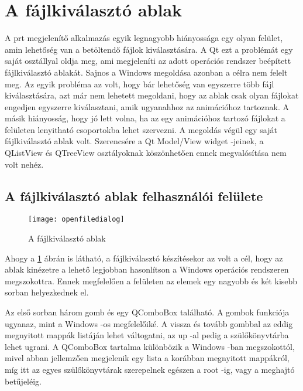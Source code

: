 \section{A fájlkiválasztó ablak}

A prt megjelenítő alkalmazás 
egyik legnagyobb hiányossága egy olyan felület, 
amin lehetőség van a betöltendő fájlok kiválasztására. 
A Qt ezt a problémát egy saját osztállyal oldja meg, 
ami megjeleníti az adott operációs rendszer 
beépített fájlkiválasztó ablakát. 
Sajnos a Windows megoldása azonban a célra nem felelt meg.
Az egyik probléma az volt,
hogy bár lehetőség van egyszerre több fájl kiválasztására, 
azt már nem lehetett megoldani, 
hogy az ablak csak olyan fájlokat engedjen egyszerre kiválasztani, 
amik ugyanahhoz az animációhoz tartoznak.
A másik hiányosság, hogy jó lett volna, 
ha az egy animációhoz tartozó fájlokat
a felületen lenyitható csoportokba lehet szervezni. 
A megoldás végül egy saját fájlkiválasztó ablak volt. 
Szerencsére a Qt Model/View widget -jeinek, a {\ttfamily QListView}
és {\ttfamily QTreeView} osztályoknak köszönhetően
ennek megvalósítása nem volt nehéz.

\subsection{A fájlkiválasztó ablak felhasználói felülete}

\begin{figure}[h]
\centering
\texttt{[image: openfiledialog]}
\caption{A fájlkiválasztó ablak}
\label{fig:x openFileDialog}
\end{figure}

Ahogy a \ref{fig:x openFileDialog} ábrán is látható, 
a fájlkiválasztó készítésekor az volt a cél, 
hogy az ablak kinézetre a lehető legjobban hasonlítson 
a Windows operációs rendszeren megszokottra. 
Ennek megfelelően a felületen az elemek egy nagyobb 
és két kisebb sorban helyezkednek el.

Az első sorban három gomb és egy {\ttfamily QComboBox} található. 
A gombok funkciója ugyanaz, mint a Windows -os megfelelőiké. 
A vissza és tovább gombbal az eddig megnyitott mappák listáján lehet váltogatni, 
az up -al pedig a szülőkönyvtárba lehet ugrani. 
A {\ttfamily QComboBox} tartalma különbözik a Windows -ban megszokottól, 
mivel abban jellemzően megjelenik egy lista a korábban megnyitott mappákról, 
míg itt az egyes szülőkönyvtárak szerepelnek egészen a root -ig, 
vagy a meghajtó betűjeléig.


